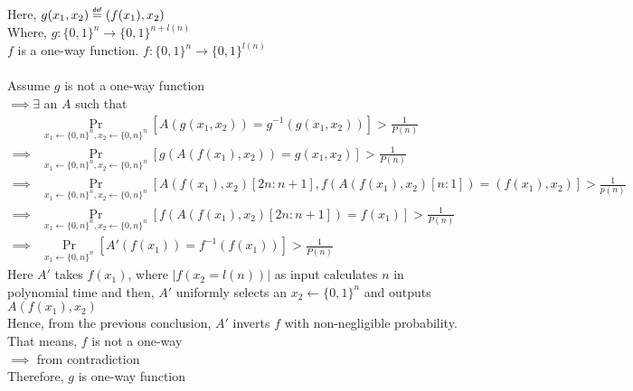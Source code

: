 \documentclass[11pt]{exam}
\newcommand\myeq{\mathrel{\overset{\makebox[0pt]{\mbox{\normalfont\tiny\sffamily def}}}{=}}}
\begin{document}
\begin{questions}
\begin{solution}
    Here, $g(x_1,x_2)\myeq\left(f(x_1),x_2\right)$\\
    Where, $g:\{0,1\}^n \rightarrow \{0,1\}^{n+l(n)}$\\
    $f$ is a one-way function. $f:\{0,1\}^n \rightarrow \{0,1\}^{l(n)}$\\
    \\
    Assume $g$ is not a one-way function\\
    $\implies \exists$ an $A$ such that\\
    \begin{align*}
        &\Pr\limits_{x_1\leftarrow\{0,n\}^n, x_2\leftarrow\{0,n\}^n}[A(g(x_1,x_2)) = g^{-1}(g(x_1,x_2))] > \frac{1}{P(n)}\\
        \implies &\Pr\limits_{x_1\leftarrow\{0,n\}^n, x_2\leftarrow\{0,n\}^n} [g(A(f(x_1),x_2)) = g(x_1,x_2)] > \frac{1}{P(n)}\\
        \implies &\Pr\limits_{x_1\leftarrow\{0,n\}^n, x_2\leftarrow\{0,n\}^n}
        [A(f(x_1) , x_2)[2n:n+1], f(A(f(x_1),x_2)[n:1]) = (f(x_1),x_2)] > \frac{1}{p(n)}\\
        \implies &\Pr\limits_{x_1\leftarrow\{0,n\}^n, x_2\leftarrow\{0,n\}^n}
        [f(A(f(x_1),x_2)[2n:n+1]) = f(x_1)] > \frac{1}{P(n)}\\
        \implies &\Pr\limits_{x_1\leftarrow\{0,n\}^n}
        [A'(f(x_1)) = f^{-1}(f(x_1))] > \frac{1}{P(n)}
    \end{align*}
    Here $A'$ takes $f(x_1)$, where $|f(x_2 = l(n))|$ as input calculates $n$ in polynomial time and then, $A'$ uniformly selects an $x_2 \leftarrow \{0,1\}^n$ and outputs $A(f(x_1),x_2)$\\
    Hence, from the previous conclusion, $A'$ inverts $f$ with non-negligible probability.\\
    That means, $f$ is not a one-way\\
    $\implies$ from contradiction\\
    Therefore,  $g$ is one-way function
    
\end{solution}


\end{questions}
\end{document}
